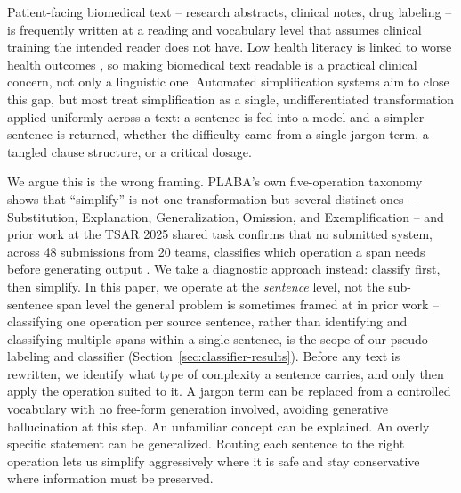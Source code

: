 \documentclass[11pt]{article}
\begin{document}
Patient-facing biomedical text -- research abstracts, clinical notes, drug
labeling -- is frequently written at a reading and vocabulary level that assumes
clinical training the intended reader does not have. Low health literacy is linked
to worse health outcomes \citep{berkman2011health}, so making biomedical text
readable is a practical clinical concern, not only a linguistic one. Automated
simplification systems aim to close this gap, but most treat simplification as a
single, undifferentiated transformation applied uniformly across a text: a
sentence is fed into a model and a simpler sentence is returned, whether the
difficulty came from a single jargon term, a tangled clause structure, or a
critical dosage.

We argue this is the wrong framing. PLABA's own five-operation taxonomy
\citep{attal2023plaba} shows that ``simplify'' is not one transformation but
several distinct ones -- Substitution, Explanation, Generalization, Omission, and
Exemplification -- and prior work at the TSAR 2025 shared task confirms that no
submitted system, across 48 submissions from 20 teams, classifies which operation
a span needs before generating output \citep{alvamanchego2025tsarfindings}. We take
a diagnostic approach instead: classify first, then simplify. In this paper, we
operate at the \emph{sentence} level, not the sub-sentence span level the general
problem is sometimes framed at in prior work -- classifying one operation per
source sentence, rather than identifying and classifying multiple spans within a
single sentence, is the scope of our pseudo-labeling and classifier
(Section~\ref{sec:classifier-results}). Before any text is rewritten, we identify
what type of complexity a sentence carries, and only then apply the operation
suited to it. A jargon term can be replaced from a controlled vocabulary with no
free-form generation involved, avoiding generative hallucination at this step.
An unfamiliar concept can be
explained. An overly specific statement can be generalized. Routing each sentence
to the right operation lets us simplify aggressively where it is safe and stay
conservative where information must be preserved.
\end{document}
